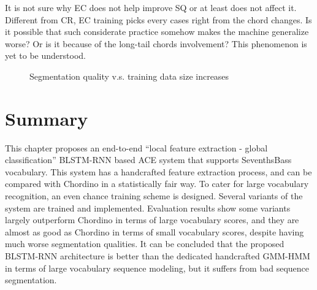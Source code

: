 It is not sure why EC does not help improve SQ or at least does not affect it. Different from CR, EC training picks every cases right from the chord changes. Is it possible that such considerate practice somehow makes the machine generalize worse? Or is it because of the long-tail chords involvement? This phenomenon is yet to be understood.

\begin{figure}[h]
\centering
{}
\caption{Segmentation quality v.s. training data size increases}
\label{fig:3-seg-traindata}
\end{figure}

\section{Summary}\label{sec:4-concln}
This chapter proposes an end-to-end ``local feature extraction - global classification'' BLSTM-RNN based ACE system that supports SeventhsBass vocabulary. This system has a handcrafted feature extraction process, and can be compared with Chordino in a statistically fair way. To cater for large vocabulary recognition, an even chance training scheme is designed. Several variants of the system are trained and implemented. Evaluation results show some variants largely outperform Chordino in terms of large vocabulary scores, and they are almost as good as Chordino in terms of small vocabulary scores, despite having much worse segmentation qualities. It can be concluded that the proposed BLSTM-RNN architecture is better than the dedicated handcrafted GMM-HMM in terms of large vocabulary sequence modeling, but it suffers from bad sequence segmentation.

